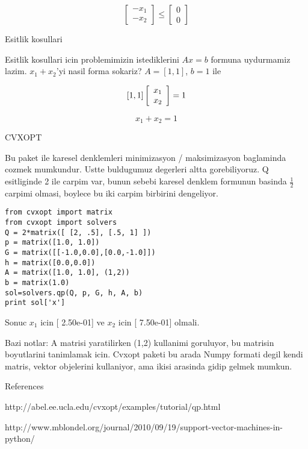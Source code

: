 \documentclass[12pt,fleqn]{article}\usepackage{../common}
\begin{document}
\[ 
\left[ \begin{array}{c}
    -x_1 \\
    -x_2
\end{array} \right]
\leq
\left[ \begin{array}{c}
    0 \\
    0
\end{array} \right]
 \]

Esitlik kosullari

Esitlik kosullari icin problemimizin istediklerini $Ax = b$ formuna uydurmamiz
lazim. $x_1 + x_2$'yi nasil forma sokariz? $A = [1, 1]$, $b = 1$ ile

\[ 
[1, 1] \left[ \begin{array}{c}
    x_1 \\
    x_2
\end{array} \right] 
= 1 \\
 \]

\[ x_1 + x_2 = 1 \]

CVXOPT

Bu paket ile karesel denklemleri minimizasyon / maksimizasyon baglaminda cozmek
mumkundur. Ustte buldugumuz degerleri altta gorebiliyoruz. Q esitliginde 2 ile
carpim var, bunun sebebi karesel denklem formunun basinda $\frac{1}{2}$ carpimi
olmasi, boylece bu iki carpim birbirini dengeliyor.

\begin{verbatim}
from cvxopt import matrix
from cvxopt import solvers
Q = 2*matrix([ [2, .5], [.5, 1] ])
p = matrix([1.0, 1.0])
G = matrix([[-1.0,0.0],[0.0,-1.0]])
h = matrix([0.0,0.0])
A = matrix([1.0, 1.0], (1,2))
b = matrix(1.0)
sol=solvers.qp(Q, p, G, h, A, b)
print sol['x']
\end{verbatim}

Sonuc $x_1$ icin [ 2.50e-01] ve $x_2$ icin [ 7.50e-01] olmali.

Bazi notlar: A matrisi yaratilirken (1,2) kullanimi goruluyor, bu matrisin
boyutlarini tanimlamak icin. Cvxopt paketi bu arada Numpy formati degil kendi
matris, vektor objelerini kullaniyor, ama ikisi arasinda gidip gelmek mumkun. 

References

http://abel.ee.ucla.edu/cvxopt/examples/tutorial/qp.html

http://www.mblondel.org/journal/2010/09/19/support-vector-machines-in-python/
\end{document}
